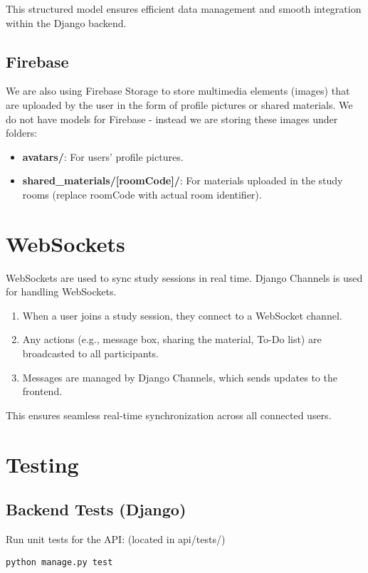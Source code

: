 \documentclass[a4paper,12pt]{article}
\begin{document}
\noindent This structured model ensures efficient data management and smooth integration within the Django backend.

\subsection{Firebase}
We are also using Firebase Storage to store multimedia elements (images) that are uploaded by the user in the form of profile pictures or shared materials. We do not have models for Firebase - instead we are storing these images under folders:

\begin{itemize}
    \item \textbf{avatars/}: For users' profile pictures.
    \item \textbf{shared\_materials/[roomCode]/}: For materials uploaded in the study rooms (replace roomCode with actual room identifier).
\end{itemize}

\section{WebSockets}
WebSockets are used to sync study sessions in real time. Django Channels is used for handling WebSockets.

\begin{enumerate}
    \item When a user joins a study session, they connect to a WebSocket channel.
    \item Any actions (e.g., message box, sharing the material, To-Do list) are broadcasted to all participants.
    \item Messages are managed by Django Channels, which sends updates to the frontend.
\end{enumerate}

This ensures seamless real-time synchronization across all connected users.


\section{Testing}
\subsection{Backend Tests (Django)}
Run unit tests for the API: (located in api/tests/)
\begin{verbatim}
python manage.py test
\end{verbatim}
\end{document}
